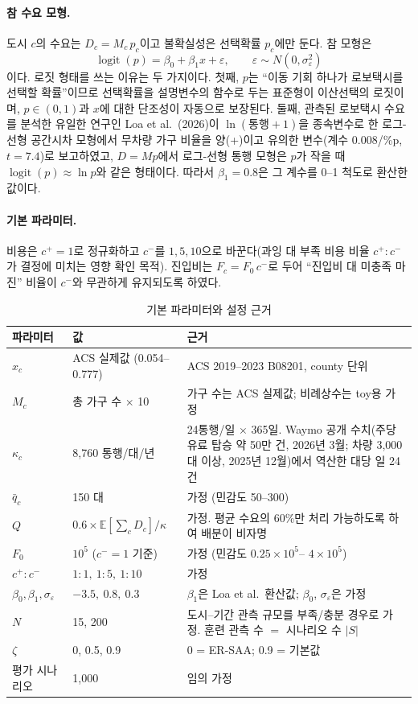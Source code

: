 \documentclass[10pt,a4paper]{article}
\DeclareMathOperator{\logit}{logit}
\begin{document}
\paragraph{참 수요 모형.}
도시 $c$의 수요는 $D_c=M_c\,p_c$이고 불확실성은 선택확률 $p_c$에만 둔다. 참 모형은
\begin{equation}\label{eq:truth}
\logit(p)= \beta_0+\beta_1 x+\varepsilon,\qquad \varepsilon\sim N(0,\sigma_\varepsilon^2)
\end{equation}
이다. 로짓 형태를 쓰는 이유는 두 가지이다. 첫째, $p$는 ``이동 기회 하나가 로보택시를 선택할 확률''이므로 선택확률을 설명변수의 함수로 두는 표준형이 이산선택의 로짓이며, $p\in(0,1)$과 $x$에 대한 단조성이 자동으로 보장된다. 둘째, 관측된 로보택시 수요를 분석한 유일한 연구인 Loa et al.\ (2026)이 $\ln(\text{통행}+1)$을 종속변수로 한 로그-선형 공간시차 모형에서 무차량 가구 비율을 양(+)이고 유의한 변수(계수 $0.008$/\%p, $t=7.4$)로 보고하였고, $D=Mp$에서 로그-선형 통행 모형은 $p$가 작을 때 $\logit(p)\approx\ln p$와 같은 형태이다. 따라서 $\beta_1=0.8$은 그 계수를 0--1 척도로 환산한 값이다.

\paragraph{기본 파라미터.}
비용은 $c^+=1$로 정규화하고 $c^-$를 $1, 5, 10$으로 바꾼다(과잉 대 부족 비용 비율 $c^+:c^-$가 결정에 미치는 영향 확인 목적). 진입비는 $F_c=F_0\,c^-$로 두어 ``진입비 대 미충족 마진'' 비율이 $c^-$와 무관하게 유지되도록 하였다.

\begin{table}[H]\centering\small
\caption{기본 파라미터와 설정 근거}\label{tab:param}
\begin{tabular}{@{}llp{}@{}}
\toprule
파라미터 & 값 & 근거 \\ \midrule
$x_c$ & ACS 실제값 (0.054--0.777) & ACS 2019--2023 B08201, county 단위 \\
$M_c$ & 총 가구 수 $\times$ 10 & 가구 수는 ACS 실제값; 비례상수는 toy용 가정 \\
$\kappa_c$ & 8{,}760 통행/대/년 & 24통행/일 $\times$ 365일. Waymo 공개 수치(주당 유료 탑승 약 50만 건, 2026년 3월; 차량 3{,}000대 이상, 2025년 12월)에서 역산한 대당 일 24건 \\
$\bar q_c$ & 150 대 & 가정 (민감도 50--300) \\
$Q$ & $0.6\times\mathbb E[\sum_c D_c]/\kappa$ & 가정. 평균 수요의 60\%만 처리 가능하도록 하여 배분이 비자명 \\
$F_0$ & $10^5$ ($c^-=1$ 기준) & 가정 (민감도 $0.25\times10^5$-- $4\times10^5$) \\
$c^+:c^-$ & $1:1,\ 1:5,\ 1:10$ & 가정 \\
$\beta_0,\beta_1,\sigma_\varepsilon$ & $-3.5,\ 0.8,\ 0.3$ & $\beta_1$은 Loa et al.\ 환산값; $\beta_0$, $\sigma_\varepsilon$은 가정 \\
$N$ & 15, 200 & 도시--기간 관측 규모를 부족/충분 경우로 가정. 훈련 관측 수 $=$ 시나리오 수 $|S|$ \\
$\zeta$ & 0, 0.5, 0.9 & 0 = ER-SAA; 0.9 = 기본값 \\
평가 시나리오 & 1{,}000 & 임의 가정 \\
\bottomrule
\end{tabular}
\end{table}
\end{document}
